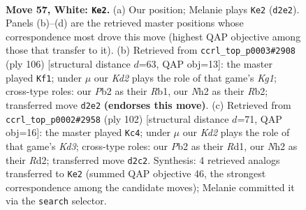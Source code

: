 \documentclass[11pt]{article}
\begin{document}
\begin{figure}[p]\centering
\begin{subfigure}{0.46\textwidth}\centering
\resizebox{\linewidth}{!}{%
\newchessgame
\chessboard[
  setfen={1rk2b2/6p1/p1p4r/Pp1b1p1p/2p2P1P/2B1P1P1/1P1K3N/1R4R1 w - - 15 57},
  showmover=false,
  pgfstyle=straightmove, color=movearrow, markmove={d2-e2}
]}
\caption{}
\end{subfigure}\hfill
\begin{subfigure}{0.46\textwidth}\centering
\resizebox{\linewidth}{!}{%
\newchessgame
\chessboard[
  setfen={r7/5p2/1p1rk3/1B1p3p/P1pPp2P/4PbP1/PR3P2/1R4K1 w - - 19 54},
  showmover=false,
  pgfstyle=straightmove, color=movearrow, markmove={g1-f1}
]}
\caption{}
\end{subfigure}
\\[4pt]
\begin{subfigure}{0.46\textwidth}\centering
\resizebox{\linewidth}{!}{%
\newchessgame
\chessboard[
  setfen={rr2n3/4bk2/5p2/2p1p1p1/p3P2p/N1BK3P/PP1R1PP1/3R4 w - - 10 52},
  showmover=false,
  pgfstyle=straightmove, color=movearrow, markmove={d3-c4}
]}
\caption{}
\end{subfigure}\hfill

\caption{\textbf{Move 57, White: \texttt{Ke2}.} (a) Our position; Melanie plays \texttt{Ke2} (\texttt{d2e2}). Panels (b)--(d) are the retrieved master positions whose correspondence most drove this move (highest QAP objective among those that transfer to it). (b) Retrieved from \texttt{ccrl\_top\_p0003\#2908} (ply 106) [structural distance $d$=63, QAP obj=13]: the master played \texttt{Kf1}; under $\mu$ our \emph{Kd2} plays the role of that game's \emph{Kg1}; cross-type roles: our \emph{P}b2 as their \emph{R}b1, our \emph{N}h2 as their \emph{R}b2; transferred move \texttt{d2e2} \textbf{(endorses this move)}. (c) Retrieved from \texttt{ccrl\_top\_p0002\#2958} (ply 102) [structural distance $d$=71, QAP obj=16]: the master played \texttt{Kc4}; under $\mu$ our \emph{Kd2} plays the role of that game's \emph{Kd3}; cross-type roles: our \emph{P}b2 as their \emph{R}d1, our \emph{N}h2 as their \emph{R}d2; transferred move \texttt{d2c2}. Synthesis: 4 retrieved analogs transferred to \texttt{Ke2} (summed QAP objective 46, the strongest correspondence among the candidate moves); Melanie committed it via the \texttt{search} selector.}
\label{fig:thought-m112}
\end{figure}

\clearpage
\end{document}

